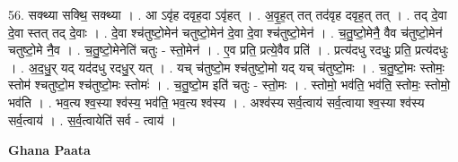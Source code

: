 \documentclass[17pt]{extarticle}
\begin{document}
56. सक्थ्या सक्थि॒ सक्थ्या । . आ ऽवृ॑ह दवृह॒दा ऽवृ॑हत् । . अ॒वृ॒ह॒त् तत् तद॑वृह दवृह॒त् तत् । . तद् दे॒वा दे॒वा स्तत् तद् दे॒वाः । . दे॒वा श्च॑तुष्टो॒मेन॑ चतुष्टो॒मेन॑ दे॒वा दे॒वा श्च॑तुष्टो॒मेन॑ । . च॒तु॒ष्टो॒मेनै॒ वैव च॑तुष्टो॒मेन॑ चतुष्टो॒मे नै॒व । . च॒तु॒ष्टो॒मेनेति॑ चतुः - स्तो॒मेन॑ । . ए॒व प्रति॒ प्रत्ये॒वैव प्रति॑ । . प्रत्य॑दधु रदधुः॒ प्रति॒ प्रत्य॑दधुः । . अ॒द॒धु॒र् यद् यद॑दधु रदधु॒र् यत् । . यच् च॑तुष्टो॒म श्च॑तुष्टो॒मो यद् यच् च॑तुष्टो॒मः । . च॒तु॒ष्टो॒मः स्तोमः॒ स्तोम॑ श्चतुष्टो॒म श्च॑तुष्टो॒मः स्तोमः॑ । . च॒तु॒ष्टो॒म इति॑ चतुः - स्तो॒मः । . स्तोमो॒ भव॑ति॒ भव॑ति॒ स्तोमः॒ स्तोमो॒ भव॑ति । . भव॒त्य श्व॒स्या श्व॑स्य॒ भव॑ति॒ भव॒त्य श्व॑स्य । . अश्व॑स्य सर्व॒त्वाय॑ सर्व॒त्वाया श्व॒स्या श्व॑स्य सर्व॒त्वाय॑ । . स॒र्व॒त्वायेति॑ सर्व - त्वाय॑ । \newline

\textbf{Ghana Paata } \newline
\end{document}
